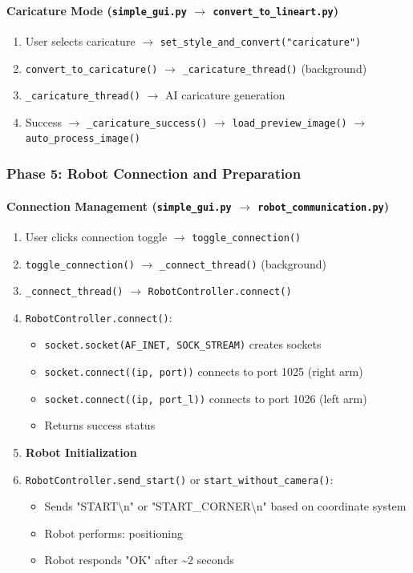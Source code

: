 \documentclass[a4paper,12pt]{article}
\begin{document}
\paragraph{Caricature Mode (\texttt{simple\_gui.py} $\rightarrow$ \texttt{convert\_to\_lineart.py})}
\begin{enumerate}
\item User selects caricature $\rightarrow$ \texttt{set\_style\_and\_convert("caricature")}
\item \texttt{convert\_to\_caricature()} $\rightarrow$ \texttt{\_caricature\_thread()} (background)
\item \texttt{\_caricature\_thread()} $\rightarrow$ AI caricature generation
\item Success $\rightarrow$ \texttt{\_caricature\_success()} $\rightarrow$ \texttt{load\_preview\_image()} $\rightarrow$ \texttt{auto\_process\_image()}
\end{enumerate}

\subsubsection{Phase 5: Robot Connection and Preparation}

\paragraph{Connection Management (\texttt{simple\_gui.py} $\rightarrow$ \texttt{robot\_communication.py})}
\begin{enumerate}
\item User clicks connection toggle $\rightarrow$ \texttt{toggle\_connection()}
\item \texttt{toggle\_connection()} $\rightarrow$ \texttt{\_connect\_thread()} (background)
\item \texttt{\_connect\_thread()} $\rightarrow$ \texttt{RobotController.connect()}
\item \texttt{RobotController.connect()}:
	\begin{itemize}
	\item \texttt{socket.socket(AF\_INET, SOCK\_STREAM)} creates sockets
	\item \texttt{socket.connect((ip, port))} connects to port 1025 (right arm)
	\item \texttt{socket.connect((ip, port\_l))} connects to port 1026 (left arm)
	\item Returns success status
	\end{itemize}

\item \textbf{Robot Initialization}
\item \texttt{RobotController.send\_start()} or \texttt{start\_without\_camera()}:
	\begin{itemize}
	\item Sends "START\textbackslash n" or "START\_CORNER\textbackslash n" based on coordinate system
	\item Robot performs: positioning
	\item Robot responds "OK" after \textasciitilde2 seconds
	\end{itemize}
\end{enumerate}
\end{document}
